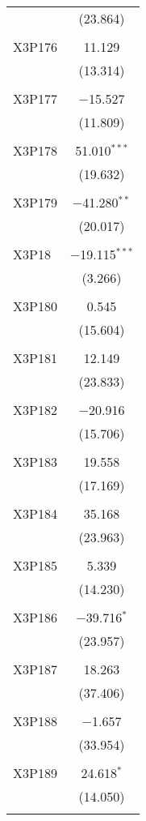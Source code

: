 \begin{table}[!htbp]
\begin{tabular}{@{\extracolsep{5pt}}lc}
  & (23.864) \\ 
  & \\ 
 X3P176 & 11.129 \\ 
  & (13.314) \\ 
  & \\ 
 X3P177 & $-$15.527 \\ 
  & (11.809) \\ 
  & \\ 
 X3P178 & 51.010$^{***}$ \\ 
  & (19.632) \\ 
  & \\ 
 X3P179 & $-$41.280$^{**}$ \\ 
  & (20.017) \\ 
  & \\ 
 X3P18 & $-$19.115$^{***}$ \\ 
  & (3.266) \\ 
  & \\ 
 X3P180 & 0.545 \\ 
  & (15.604) \\ 
  & \\ 
 X3P181 & 12.149 \\ 
  & (23.833) \\ 
  & \\ 
 X3P182 & $-$20.916 \\ 
  & (15.706) \\ 
  & \\ 
 X3P183 & 19.558 \\ 
  & (17.169) \\ 
  & \\ 
 X3P184 & 35.168 \\ 
  & (23.963) \\ 
  & \\ 
 X3P185 & 5.339 \\ 
  & (14.230) \\ 
  & \\ 
 X3P186 & $-$39.716$^{*}$ \\ 
  & (23.957) \\ 
  & \\ 
 X3P187 & 18.263 \\ 
  & (37.406) \\ 
  & \\ 
 X3P188 & $-$1.657 \\ 
  & (33.954) \\ 
  & \\ 
 X3P189 & 24.618$^{*}$ \\ 
  & (14.050) \\ 
  & \\ 

\end{tabular}
\end{table}
